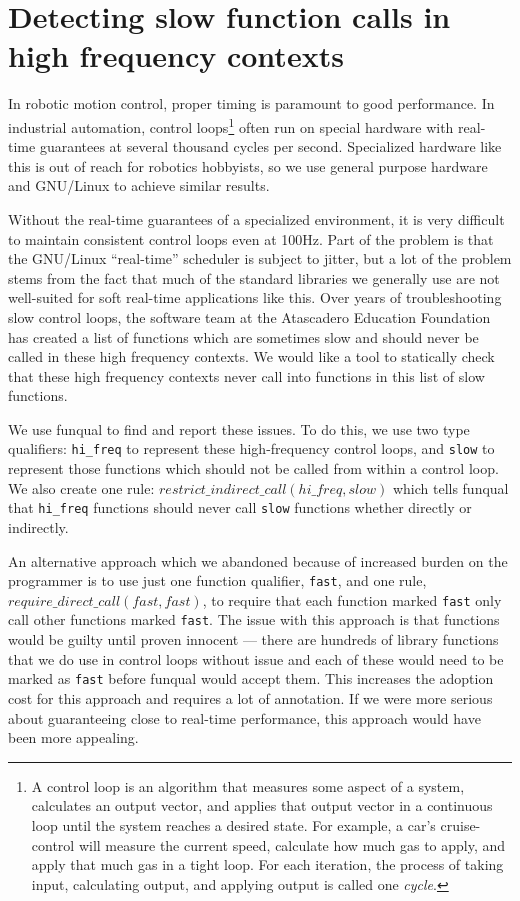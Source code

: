 \section{Detecting slow function calls in high frequency contexts}\label{sec:app:blocking}

In robotic motion control, proper timing is paramount to good performance.  In industrial automation, control loops\footnote{A control loop is an algorithm that measures some aspect of a system, calculates an output vector, and applies that output vector in a continuous loop until the system reaches a desired state.  For example, a car's cruise-control will measure the current speed, calculate how much gas to apply, and apply that much gas in a tight loop.  For each iteration, the process of taking input, calculating output, and applying output is called one \textit{cycle}.} often run on special hardware with real-time guarantees at several thousand cycles per second.  Specialized hardware like this is out of reach for robotics hobbyists, so we use general purpose hardware and GNU/Linux to achieve similar results. 

Without the real-time guarantees of a specialized environment, it is very difficult to maintain consistent control loops even at 100Hz.  Part of the problem is that the GNU/Linux ``real-time'' scheduler is subject to jitter, but a lot of the problem stems from the fact that much of the standard libraries we generally use are not well-suited for soft real-time applications like this.  Over years of troubleshooting slow control loops, the software team at the Atascadero Education Foundation has created a list of functions which are sometimes slow and should never be called in these high frequency contexts.  We would like a tool to statically check that these high frequency contexts never call into functions in this list of slow functions.  

We use funqual to find and report these issues.  To do this, we use two type qualifiers: \lstinline{hi_freq} to represent these high-frequency control loops, and \lstinline{slow} to represent those functions which should not be called from within a control loop.  We also create one rule: $restrict\_indirect\_call(hi\_freq, slow)$ which tells funqual that \lstinline{hi_freq} functions should never call \lstinline{slow} functions whether directly or indirectly. 

An alternative approach which we abandoned because of increased burden on the programmer is to use just one function qualifier, \lstinline{fast}, and one rule, $require\_direct\_call(\allowbreak fast, fast)$, to require that each function marked \lstinline{fast} only call other functions marked \lstinline{fast}.  The issue with this approach is that  functions would be guilty until proven innocent --- there are hundreds of library functions that we do use in control loops without issue and each of these would need to be marked as \lstinline{fast} before funqual would accept them.  This increases the adoption cost for this approach and requires a lot of annotation. If we were more serious about guaranteeing close to real-time performance, this approach would have been more appealing.  


